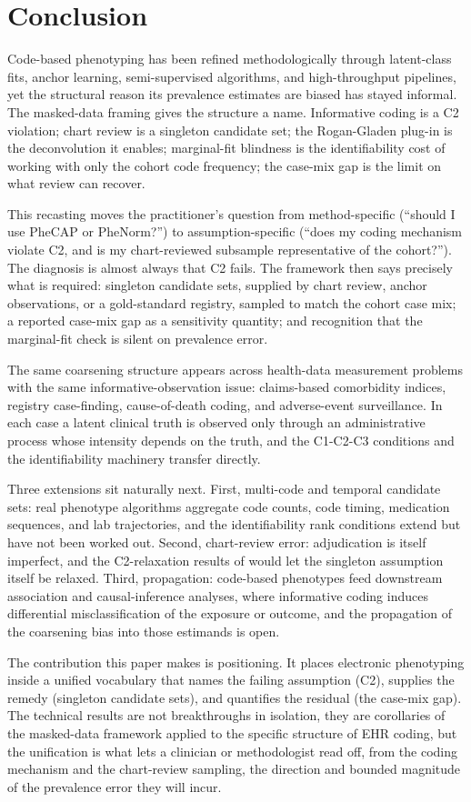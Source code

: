 \section{Conclusion}
\label{sec:conclusion}

Code-based phenotyping has been refined methodologically through
latent-class fits, anchor learning, semi-supervised algorithms, and
high-throughput pipelines, yet the structural reason its prevalence
estimates are biased has stayed informal. The masked-data framing
gives the structure a name. Informative coding is a C2 violation;
chart review is a singleton candidate set; the Rogan-Gladen plug-in is
the deconvolution it enables; marginal-fit blindness is the
identifiability cost of working with only the cohort code frequency;
the case-mix gap is the limit on what review can recover.

This recasting moves the practitioner's question from method-specific
(``should I use PheCAP or PheNorm?'') to assumption-specific (``does
my coding mechanism violate C2, and is my chart-reviewed subsample
representative of the cohort?''). The diagnosis is almost always that
C2 fails. The framework then says precisely what is required: singleton
candidate sets, supplied by chart review, anchor observations, or a
gold-standard registry, sampled to match the cohort case mix; a
reported case-mix gap as a sensitivity quantity; and recognition that
the marginal-fit check is silent on prevalence error.

The same coarsening structure appears across health-data measurement
problems with the same informative-observation issue: claims-based
comorbidity indices, registry case-finding, cause-of-death coding, and
adverse-event surveillance. In each case a latent clinical truth is
observed only through an administrative process whose intensity depends
on the truth, and the C1-C2-C3 conditions and the identifiability
machinery transfer directly.

Three extensions sit naturally next. First, multi-code and temporal
candidate sets: real phenotype algorithms aggregate code counts, code
timing, medication sequences, and lab trajectories, and the
identifiability rank conditions extend but have not been worked out.
Second, chart-review error: adjudication is itself imperfect, and the
C2-relaxation results of \citet{towell2026mdrelax} would let the
singleton assumption itself be relaxed. Third, propagation: code-based
phenotypes feed downstream association and causal-inference analyses,
where informative coding induces differential misclassification of the
exposure or outcome, and the propagation of the coarsening bias into
those estimands is open.

The contribution this paper makes is positioning. It places electronic
phenotyping inside a unified vocabulary that names the failing
assumption (C2), supplies the remedy (singleton candidate sets), and
quantifies the residual (the case-mix gap). The technical results are
not breakthroughs in isolation, they are corollaries of the
masked-data framework applied to the specific structure of EHR coding,
but the unification is what lets a clinician or methodologist read off,
from the coding mechanism and the chart-review sampling, the direction
and bounded magnitude of the prevalence error they will incur.
